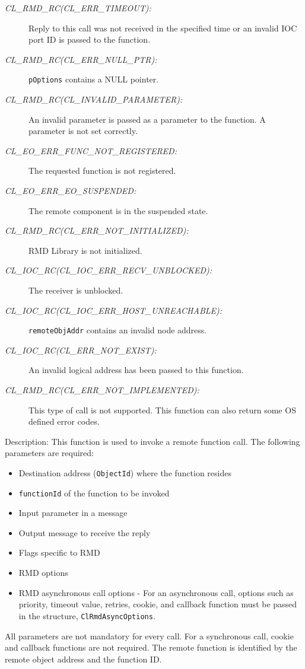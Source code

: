 \begin{flushleft}
\begin{Desc}
\begin{description}
\item[{\em CL\_\-RMD\_\-RC(CL\_\-ERR\_\-TIMEOUT):}]Reply to this call was not received in the specified time or an invalid IOC port ID is passed to the 
function.
\item[{\em CL\_\-RMD\_\-RC(CL\_\-ERR\_\-NULL\_\-PTR):}]{\tt{pOptions}} contains a NULL pointer.
\item[{\em CL\_\-RMD\_\-RC(CL\_\-INVALID\_\-PARAMETER):}]An invalid parameter is passed as a parameter to the function. A parameter is not set correctly.
\item[{\em CL\_\-EO\_\-ERR\_\-FUNC\_\-NOT\_\-REGISTERED:}]The requested function is not registered. 
\item[{\em CL\_\-EO\_\-ERR\_\-EO\_\-SUSPENDED:}]The remote component is in the suspended state.

\item[{\em CL\_\-RMD\_\-RC(CL\_\-ERR\_\-NOT\_\-INITIALIZED):}]RMD Library is not initialized. 
\item[{\em CL\_\-IOC\_\-RC(CL\_\-IOC\_\-ERR\_\-RECV\_\-UNBLOCKED):}]The receiver is unblocked.
\item[{\em CL\_\-IOC\_\-RC(CL\_\-IOC\_\-ERR\_\-HOST\_\-UNREACHABLE):}]{\tt{remoteObjAddr}} contains an invalid node address.

\item[{\em CL\_\-IOC\_\-RC(CL\_\-ERR\_\-NOT\_\-EXIST):}]An invalid logical address has been passed to this function.
\item[{\em CL\_\-RMD\_\-RC(CL\_\-ERR\_\-NOT\_\-IMPLEMENTED):}]This type of call is not supported.
        This function can also return some OS defined error codes. 

\end{description}
\end{Desc}
\begin{Desc}
\item[Description:]This function is used to invoke a remote function call. The following parameters are required:
\begin{itemize}
\item
Destination address ({\tt{ObjectId}}) where the function resides
\item
{\tt{functionId}} of the function to be invoked
\item
Input parameter in a message
\item
Output message to receive the reply
\item
Flags specific to RMD
\item
RMD options
\item
RMD asynchronous call options - For an asynchronous call, options such as priority, timeout value, retries, cookie, and callback function must be 
passed in the structure, {\tt{ClRmdAsyncOptions}}. 
\end{itemize}
All parameters are not mandatory for every call. For a synchronous call, cookie and callback functions
are not required. The remote function is identified by the remote object address and the function ID.


\end{Desc}
\end{flushleft}
